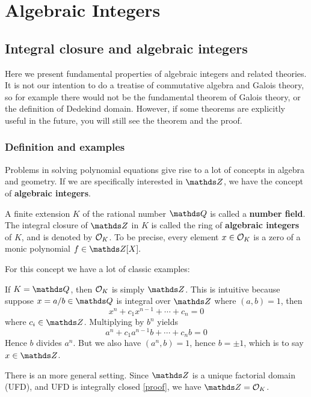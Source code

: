 \chapter{Algebraic Integers}
	\setcounter{page}{1}
	\section{Integral closure and algebraic integers}
		Here we present fundamental properties of algebraic integers and related theories. It is not our intention to do a treatise of commutative algebra and Galois theory, so for example there would not be the fundamental theorem of Galois theory, or the definition of Dedekind domain. However, if some theorems are explicitly useful in the future, you will still see the theorem and the proof.
		\subsection{Definition and examples}
			Problems in solving polynomial equations give rise to a lot of concepts in algebra and geometry. If we are specifically interested in $\mds{Z}$, we have the concept of \textbf{algebraic integers}.
			\begin{definition}
				A finite extension $K$ of the rational number $\mds{Q}$ is called a \textbf{number field}. The integral closure of $\mds{Z}$ in $K$ is called the ring of \textbf{algebraic integers} of $K$, and is denoted by $\mathcal{O}_K$. To be precise, every element $x \in \mathcal{O}_K$ is a zero of a monic polynomial $f \in \Z[X].$
			\end{definition}
			
			For this concept we have a lot of classic examples:
			
			\begin{example}
				If $K=\Q$, then $\mathcal{O}_K$ is simply $\Z$. This is intuitive because suppose $x=a/b \in \Q$ is integral over $\Z$ where $(a,b)=1$, then
				\[
				x^n+c_1x^{n-1}+\cdots+c_n = 0
				\]
				where $c_i \in \Z$. Multiplying by $b^n$ yields
				\[
				a^n+c_1a^{n-1}b+\cdots+c_nb = 0
				\]
				Hence $b$ divides $a^n$. But we also have $(a^n,b)=1$, hence $b=\pm 1$, which is to say $x \in \Z$.
				
				There is an more general setting. Since $\Z$ is a unique factorial domain (UFD), and UFD is integrally closed \href{https://proofwiki.org/wiki/Unique_Factorization_Domain_is_Integrally_Closed}{[proof]}, we have $\Z=\OK$. 
			\end{example}
			
